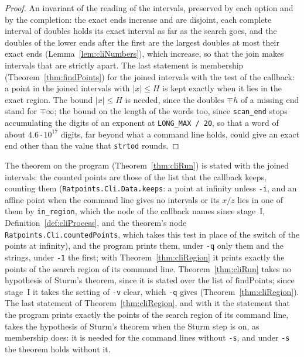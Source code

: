 \begin{proof}
  \leanok
  An invariant of the reading of the intervals, preserved by each option and by the completion: the
  exact ends increase and are disjoint, each complete interval of doubles holds its exact interval
  as far as the search goes, and the doubles of the lower ends after the first are the largest
  doubles at most their exact ends (Lemma~\ref{lem:cliNumbers}), which increase, so that the join
  makes intervals that are strictly apart. The last statement is membership
  (Theorem~\ref{thm:findPoints}) for the joined intervals with the test of the callback: a point in
  the joined intervals with $|x| \le H$ is kept exactly when it lies in the exact region. The bound
  $|x| \le H$ is needed, since the doubles $\mp h$ of a missing end stand for $\mp\infty$; the bound
  on the length of the words too, since \verb|scan_end| stops accumulating the digits of an exponent
  at \verb|LONG_MAX / 20|, so that a word of about $4.6 \cdot 10^{17}$ digits, far beyond what a
  command line holds, could give an exact end other than the value that \verb|strtod| rounds.
\end{proof}

The theorem on the program (Theorem~\ref{thm:cliRun}) is stated with the joined intervals: the
counted points are those of the list that the callback keeps, counting them
(\verb|Ratpoints.Cli.Data.keeps|: a point at infinity unless \verb|-i|, and an affine point when the
command line gives no intervals or its $x/z$ lies in one of them by \verb|in_region|, which the node
of the callback names since stage~I, Definition~\ref{def:cliProcess}, and the theorem's node
\verb|Ratpoints.Cli.countedPoints|, which takes this test in place of the switch of the points at
infinity), and the program prints them, under \verb|-q| only them and the strings, under \verb|-1|
the first; with Theorem~\ref{thm:cliRegion} it prints exactly the points of the search region of its
command line. Theorem~\ref{thm:cliRun} takes no hypothesis of Sturm's theorem, since it is stated
over the list of $\mathrm{findPoints}$; since stage~I it takes the setting of \verb|-v| clear, which
\verb|-q| gives (Theorem~\ref{thm:cliRegion}). The last statement of Theorem~\ref{thm:cliRegion},
and with it the statement that the program prints exactly the points of the search region of its
command line, takes the hypothesis of Sturm's theorem when the Sturm step is on, as membership does:
it is needed for the command lines without \verb|-s|, and under \verb|-s| the theorem holds without
it.

